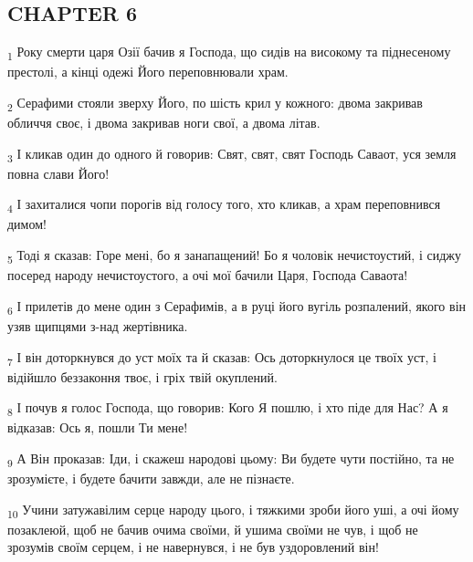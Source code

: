 \subsection{CHAPTER 6}
\begin{tcolorbox}
\textsubscript{1} Року смерти царя Озії бачив я Господа, що сидів на високому та піднесеному престолі, а кінці одежі Його переповнювали храм.
\end{tcolorbox}
\begin{tcolorbox}
\textsubscript{2} Серафими стояли зверху Його, по шість крил у кожного: двома закривав обличчя своє, і двома закривав ноги свої, а двома літав.
\end{tcolorbox}
\begin{tcolorbox}
\textsubscript{3} І кликав один до одного й говорив: Свят, свят, свят Господь Саваот, уся земля повна слави Його!
\end{tcolorbox}
\begin{tcolorbox}
\textsubscript{4} І захиталися чопи порогів від голосу того, хто кликав, а храм переповнився димом!
\end{tcolorbox}
\begin{tcolorbox}
\textsubscript{5} Тоді я сказав: Горе мені, бо я занапащений! Бо я чоловік нечистоустий, і сиджу посеред народу нечистоустого, а очі мої бачили Царя, Господа Саваота!
\end{tcolorbox}
\begin{tcolorbox}
\textsubscript{6} І прилетів до мене один з Серафимів, а в руці його вугіль розпалений, якого він узяв щипцями з-над жертівника.
\end{tcolorbox}
\begin{tcolorbox}
\textsubscript{7} І він доторкнувся до уст моїх та й сказав: Ось доторкнулося це твоїх уст, і відійшло беззаконня твоє, і гріх твій окуплений.
\end{tcolorbox}
\begin{tcolorbox}
\textsubscript{8} І почув я голос Господа, що говорив: Кого Я пошлю, і хто піде для Нас? А я відказав: Ось я, пошли Ти мене!
\end{tcolorbox}
\begin{tcolorbox}
\textsubscript{9} А Він проказав: Іди, і скажеш народові цьому: Ви будете чути постійно, та не зрозумієте, і будете бачити завжди, але не пізнаєте.
\end{tcolorbox}
\begin{tcolorbox}
\textsubscript{10} Учини затужавілим серце народу цього, і тяжкими зроби його уші, а очі йому позаклеюй, щоб не бачив очима своїми, й ушима своїми не чув, і щоб не зрозумів своїм серцем, і не навернувся, і не був уздоровлений він!
\end{tcolorbox}
